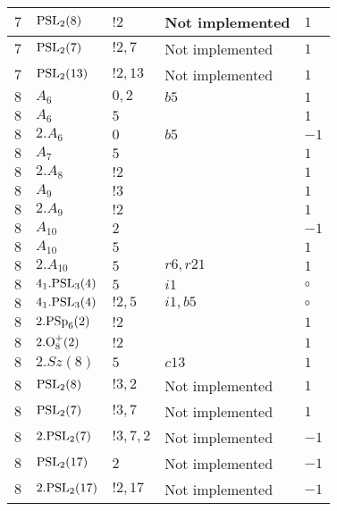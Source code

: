 \documentclass[a4paper, 11pt]{article}
\begin{document}
\begin{longtable}{lllll}
        $ 7 $ & $ {\rm PSL}_{2}(8) $ & $ !2 $ &  Not implemented & $ 1$ \\ \hline
        $ 7 $ & $ {\rm PSL}_{2}(7) $ & $ !2, 7 $ &  Not implemented & $ 1$ \\ \hline
        $ 7 $ & $ {\rm PSL}_{2}(13) $ & $ !2, 13 $ &  Not implemented & $ 1$ \\ \hline
        $ 8 $ & $ A_{6} $ & $ 0,2 $ & $ b5 $ & $ 1$ \\ \hline
        $ 8 $ & $ A_{6} $ & $ 5 $ & $ ~ $ & $ 1$ \\ \hline
        $ 8 $ & $ 2.A_{6} $ & $ 0 $ & $ b5 $ & $ -1$ \\ \hline
        $ 8 $ & $ A_{7} $ & $ 5 $ & $ ~ $ & $ 1$ \\ \hline
        $ 8 $ & $ 2.A_{8} $ & $ ! 2 $ & $ ~ $ & $ 1$ \\ \hline
        $ 8 $ & $ A_{9} $ & $ ! 3 $ & $ ~ $ & $ 1$ \\ \hline
        $ 8 $ & $ 2.A_{9} $ & $ ! 2 $ & $ ~ $ & $ 1$ \\ \hline
        $ 8 $ & $ A_{10} $ & $ 2 $ & $ ~ $ & $ -1$ \\ \hline
        $ 8 $ & $ A_{10} $ & $ 5 $ & $ ~ $ & $ 1$ \\ \hline
        $ 8 $ & $ 2.A_{10} $ & $ 5 $ & $ r6, r21 $ & $ 1$ \\ \hline
        $ 8 $ & $ 4_1.{\rm PSL}_{3}(4) $ & $ 5 $ & $ i1 $ &  $\circ$ \\ \hline
        $ 8 $ & $ 4_1.{\rm PSL}_{3}(4) $ & $ ! 2,5 $ & $ i1, b5 $ &  $\circ$ \\ \hline
        $ 8 $ & $ 2.{\rm PSp}_{6}(2) $ & $ ! 2 $ & $ ~ $ & $ 1$ \\ \hline
        $ 8 $ & $ 2.{\rm O}_{8}^+(2) $ & $ ! 2 $ & $ ~ $ & $ 1$ \\ \hline
        $ 8 $ & $ 2.Sz(8) $ & $ 5 $ & $ c13 $ & $ 1$ \\ \hline
        $ 8 $ & $ {\rm PSL}_{2}(8) $ & $ !3, 2 $ &  Not implemented & $ 1$ \\ \hline
        $ 8 $ & $ {\rm PSL}_{2}(7) $ & $ !3, 7 $ &  Not implemented & $ 1$ \\ \hline
        $ 8 $ & $ 2.{\rm PSL}_{2}(7) $ & $ !3, 7, 2 $ &  Not implemented & $ -1$ \\ \hline
        $ 8 $ & $ {\rm PSL}_{2}(17) $ & $ 2 $ &  Not implemented & $ -1$ \\ \hline
        $ 8 $ & $ 2.{\rm PSL}_{2}(17) $ & $ !2, 17 $ &  Not implemented & $ -1$ \\ \hline

\end{longtable}
\end{document}
